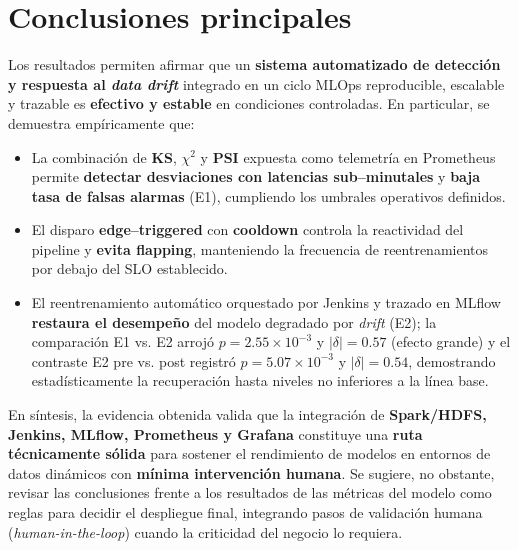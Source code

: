 
\section{Conclusiones principales}
Los resultados permiten afirmar que un \textbf{sistema automatizado de detección y respuesta al \textit{data drift}} integrado en un ciclo MLOps reproducible, escalable y trazable es \textbf{efectivo y estable} en condiciones controladas. 
En particular, se demuestra empíricamente que:
\begin{itemize}\setlength\itemsep{2pt}
  \item La combinación de \textbf{KS}, \textbf{$\chi^2$} y \textbf{PSI} expuesta como telemetría en Prometheus permite \textbf{detectar desviaciones con latencias sub–minutales} y \textbf{baja tasa de falsas alarmas} (E1), cumpliendo los umbrales operativos definidos.
  \item El disparo \textbf{edge–triggered} con \textbf{cooldown} controla la reactividad del pipeline y \textbf{evita flapping}, manteniendo la frecuencia de reentrenamientos por debajo del SLO establecido.
  \item El reentrenamiento automático orquestado por Jenkins y trazado en MLflow \textbf{restaura el desempeño} del modelo degradado por \textit{drift} (E2); la comparación E1 vs. E2 arrojó $p=2.55\times10^{-3}$ y $|\delta|=0.57$ (efecto grande) y el contraste E2 pre vs. post registró $p=5.07\times10^{-3}$ y $|\delta|=0.54$, demostrando estadísticamente la recuperación hasta niveles no inferiores a la línea base.
\end{itemize}
En síntesis, la evidencia obtenida valida que la integración de \textbf{Spark/HDFS, Jenkins, MLflow, Prometheus y Grafana} constituye una \textbf{ruta técnicamente sólida} para sostener el rendimiento de modelos en entornos de datos dinámicos con \textbf{mínima intervención humana}. Se sugiere, no obstante, revisar las conclusiones frente a los resultados de las métricas del modelo como reglas para decidir el despliegue final, integrando pasos de validación humana (\textit{human-in-the-loop}) cuando la criticidad del negocio lo requiera.

